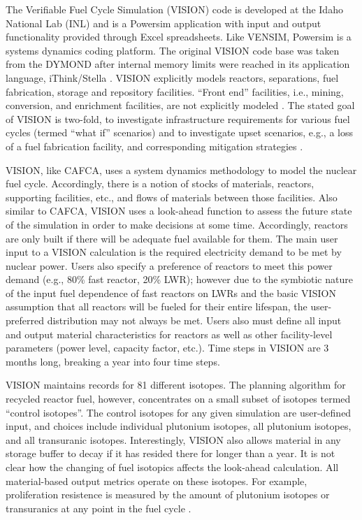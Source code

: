 The Verifiable Fuel Cycle Simulation (VISION) code is developed at the Idaho
National Lab (INL) and is a Powersim \cite{studio_powersim_2003} application
with input and output functionality provided through Excel spreadsheets. Like
VENSIM, Powersim is a systems dynamics coding platform. The original VISION code
base was taken from the DYMOND \cite{moisseytsev_dymond_2001} after internal
memory limits were reached in its application language, iThink/Stella
\cite{richmond_ithink_2004}. VISION explicitly models reactors, separations, fuel
fabrication, storage and repository facilities. ``Front end'' facilities,
i.e., mining, conversion, and enrichment facilities, are not explicitly modeled
\cite{guerin_benchmark_2009}. The stated goal of VISION is two-fold, to
investigate infrastructure requirements for various fuel cycles (termed ``what
if'' scenarios) \cite{jacobson_verifiable_2010} and to investigate upset
scenarios, e.g., a loss of a fuel fabrication facility, and corresponding
mitigation strategies \cite{schweitzer_improved_2008}.

VISION, like CAFCA, uses a system dynamics methodology to model the nuclear fuel
cycle. Accordingly, there is a notion of stocks of materials, reactors,
supporting facilities, etc., and flows of materials between those
facilities. Also similar to CAFCA, VISION uses a look-ahead function to assess
the future state of the simulation in order to make decisions at some
time. Accordingly, reactors are only built if there will be adequate fuel
available for them. The main user input to a VISION calculation is the required
electricity demand to be met by nuclear power. Users also specify a preference
of reactors to meet this power demand (e.g., 80\% fast reactor, 20\% LWR);
however due to the symbiotic nature of the input fuel dependence of fast
reactors on LWRs and the basic VISION assumption that all reactors will be
fueled for their entire lifespan, the user-preferred distribution may not always
be met. Users also must define all input and output material characteristics for
reactors as well as other facility-level parameters (power level, capacity
factor, etc.). Time steps in VISION are 3 months long, breaking a year into four
time steps.

VISION maintains records for 81 different isotopes. The planning algorithm for
recycled reactor fuel, however, concentrates on a small subset of isotopes
termed ``control isotopes''. The control isotopes for any given simulation are
user-defined input, and choices include individual plutonium isotopes, all
plutonium isotopes, and all transuranic isotopes. Interestingly, VISION also
allows material in any storage buffer to decay if it has resided there for
longer than a year. It is not clear how the changing of fuel isotopics affects
the look-ahead calculation. All material-based output metrics operate on these
isotopes. For example, proliferation resistence is measured by the amount of
plutonium isotopes or transuranics at any point in the fuel cycle
\cite{yacout_vision_2006}.

